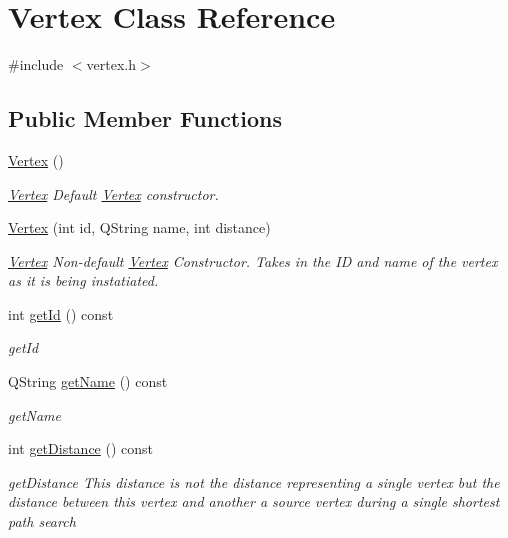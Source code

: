 \hypertarget{class_vertex}{}\section{Vertex Class Reference}
\label{class_vertex}


{\ttfamily \#include $<$vertex.\+h$>$}

\subsection*{Public Member Functions}
\begin{DoxyCompactItemize}
\item 
\hyperlink{class_vertex_a97488994a2482d70da74e1b91d40e169}{Vertex} ()
\begin{DoxyCompactList}\small\item\em \hyperlink{class_vertex}{Vertex} Default \hyperlink{class_vertex}{Vertex} constructor. \end{DoxyCompactList}\item 
\hyperlink{class_vertex_ade66bd39dce6ed6f1bdf4d93af045f56}{Vertex} (int id, Q\+String name, int distance)
\begin{DoxyCompactList}\small\item\em \hyperlink{class_vertex}{Vertex} Non-\/default \hyperlink{class_vertex}{Vertex} Constructor. Takes in the ID and name of the vertex as it is being instatiated. \end{DoxyCompactList}\item 
int \hyperlink{class_vertex_aa61ee83bfe1b0c80f0b554663bdbd2da}{get\+Id} () const 
\begin{DoxyCompactList}\small\item\em get\+Id \end{DoxyCompactList}\item 
Q\+String \hyperlink{class_vertex_af870d1f4fd501f7167c71461e3764cf5}{get\+Name} () const 
\begin{DoxyCompactList}\small\item\em get\+Name \end{DoxyCompactList}\item 
int \hyperlink{class_vertex_a754900c038f5a3b1da20c0448eb97fce}{get\+Distance} () const 
\begin{DoxyCompactList}\small\item\em get\+Distance This distance is not the distance representing a single vertex but the distance between this vertex and another a \textquotesingle{}source\textquotesingle{} vertex during a single shortest path search \end{DoxyCompactList}\item 

\end{DoxyCompactItemize}
